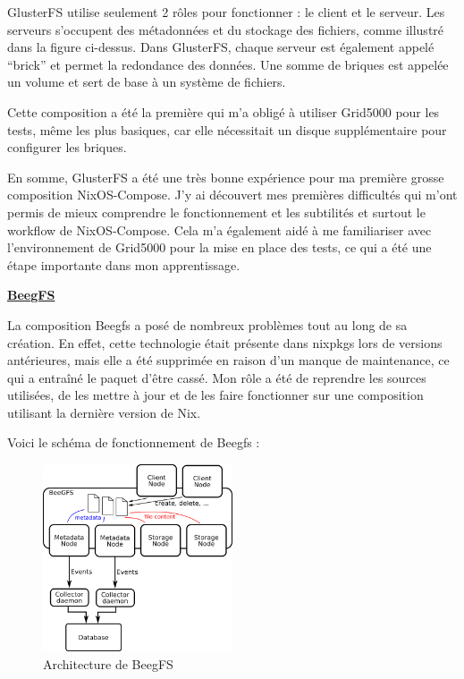 \documentclass[a4paper,french,12pt, titlepage]{article}
\begin{document}
GlusterFS utilise seulement 2 rôles pour fonctionner : le client et le
serveur. Les serveurs s'occupent des métadonnées et du stockage des
fichiers, comme illustré dans la figure ci-dessus. Dans GlusterFS,
chaque serveur est également appelé ``brick'' et permet la redondance
des données. Une somme de briques est appelée un volume et sert de base
à un système de fichiers.\newline

Cette composition a été la première qui m'a obligé à utiliser Grid5000
pour les tests, même les plus basiques, car elle nécessitait un disque
supplémentaire pour configurer les briques.\newline

En somme, GlusterFS a été une très bonne expérience pour ma première
grosse composition NixOS-Compose. J'y ai découvert mes premières
difficultés qui m'ont permis de mieux comprendre le fonctionnement et
les subtilités et surtout le workflow de NixOS-Compose. Cela m'a
également aidé à me familiariser avec l'environnement de Grid5000 pour
la mise en place des tests, ce qui a été une étape importante dans mon
apprentissage.\newline

\textbf{\href{https://www.beegfs.io/c/}{BeegFS} \cite{beegfs2014}}

La composition Beegfs a posé de nombreux problèmes tout au long de sa
création. En effet, cette technologie était présente dans nixpkgs lors
de versions antérieures, mais elle a été supprimée en raison d'un manque
de maintenance, ce qui a entraîné le paquet d'être cassé. Mon rôle a été
de reprendre les sources utilisées, de les mettre à jour et de les faire
fonctionner sur une composition utilisant la dernière version de
Nix.\newline

Voici le schéma de fonctionnement de Beegfs :

\begin{figure}[h]
\centering
\includegraphics[width=0.5\textwidth,height=0.5\textheight,keepaspectratio]{images/shema-beegfs.png}
\caption{Architecture de BeegFS}
\end{figure}
\end{document}
